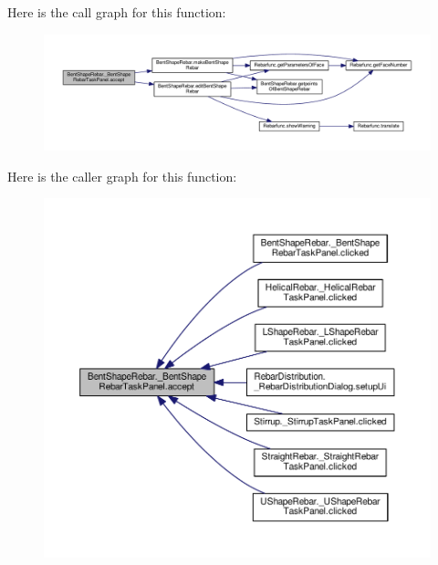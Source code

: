 Here is the call graph for this function\+:\nopagebreak
\begin{figure}[H]
\begin{center}
\leavevmode
\includegraphics[width=350pt]{classBentShapeRebar_1_1__BentShapeRebarTaskPanel_afdcf71c6a16711a535971366558ea918_cgraph}
\end{center}
\end{figure}




Here is the caller graph for this function\+:\nopagebreak
\begin{figure}[H]
\begin{center}
\leavevmode
\includegraphics[width=350pt]{classBentShapeRebar_1_1__BentShapeRebarTaskPanel_afdcf71c6a16711a535971366558ea918_icgraph}
\end{center}
\end{figure}


